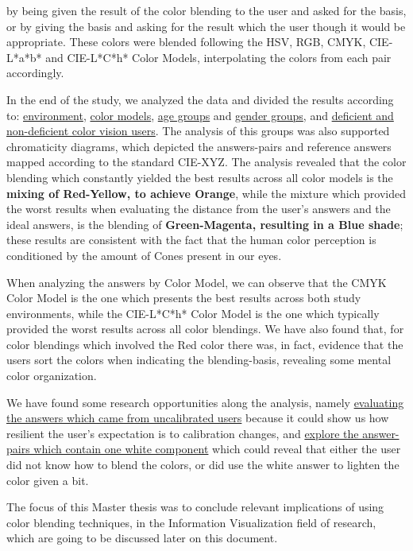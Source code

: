 by being given the result of the color blending to the user and asked for the basis, or by giving the basis and asking
for the result which the user though it would be appropriate. These colors were blended following the HSV, RGB, CMYK,
CIE-L*a*b* and CIE-L*C*h* Color Models, interpolating the colors from each pair accordingly. \par
%
In the end of the study, we analyzed the data and divided the results according to: \ul{environment}, \ul{color
models}, \ul{age groups} and \ul{gender groups}, and \ul{deficient and non-deficient color vision users}. The analysis
of this groups was also supported chromaticity diagrams, which depicted the answers-pairs and reference answers
mapped according to the standard CIE-XYZ. The analysis revealed that the color blending which constantly yielded the
best results across all color models is the \textbf{mixing of Red-Yellow, to achieve Orange}, while the mixture which
provided the worst results when evaluating the distance from the user’s answers and the ideal answers, is the blending
of \textbf{Green-Magenta, resulting in a Blue shade}; these results are consistent with the fact that the human color
perception is conditioned by the amount of Cones present in our eyes. \par
%
When analyzing the answers by Color Model, we can observe that the CMYK Color Model is the one which presents the best
results across both study environments, while the CIE-L*C*h* Color Model is the one which typically provided the worst
results across all color blendings. We have also found that, for color blendings which involved the Red color there was,
in fact, evidence that the users sort the colors when indicating the blending-basis, revealing some mental color organization. \par
%
We have found some research opportunities along the analysis, namely \ul{evaluating the answers which came from
uncalibrated users} because it could show us how resilient the user's expectation is to calibration changes, and \ul{explore
the answer-pairs which contain one white component} which could reveal that either the user did not know how to blend
the colors, or did use the white answer to lighten the color given a bit. \par
%
The focus of this Master thesis was to conclude relevant implications of using color blending techniques, in the Information
Visualization field of research, which are going to be discussed later on this document.
%
